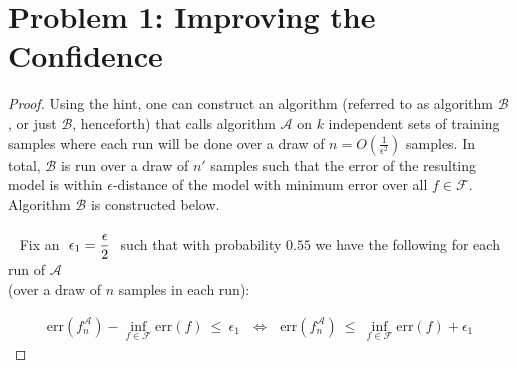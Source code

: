 \documentclass[twoside,11pt]{homework}
\date{\today} %
\DeclarePairedDelimiter{\2norm}{\lVert}{\rVert^2_2}
\newcommand{\1}[1]{\mathds{1}\left[#1\right]}
\begin{document}
\maketitle

\section*{Problem 1: Improving the Confidence}

\begin{proof}
Using the hint, one can construct an algorithm (referred to as algorithm $\mathcal{B}$, or just $\mathcal{B}$, henceforth) that calls algorithm $\mathcal{A}$ on $k$ independent sets of training samples where each run will be done over a draw of $n = O\left(\frac{1}{\epsilon^2}\right)$ samples. In total, $\mathcal{B}$ is run over a draw of $n'$ samples such that the error of the resulting model is within $\epsilon$-distance of the model with minimum error over all $f \in \mathcal{F}$. Algorithm $\mathcal{B}$ is constructed below.\\\ \\\
%
Fix an $ \ \mathlarger{\epsilon_1 = \frac{\epsilon}{2}} \ $ such that with probability $0.55$ we have the following for each run of $\mathcal{A}$\\[0.3em] (over a draw of $n$ samples in each run): 

\begin{align}\label{ineq1}
\text{err}(f_n^{\mathcal{A}}) - \inf_{f \in \mathcal{F}}\text{err}(f) \ \leq \ \epsilon_1 \ \ \ 
\Longleftrightarrow \ \ \ \text{err}(f_n^{\mathcal{A}}) \ \leq \ \inf_{f \in \mathcal{F}}\text{err}(f) + \epsilon_1 
\end{align}



\end{proof}
\end{document}
